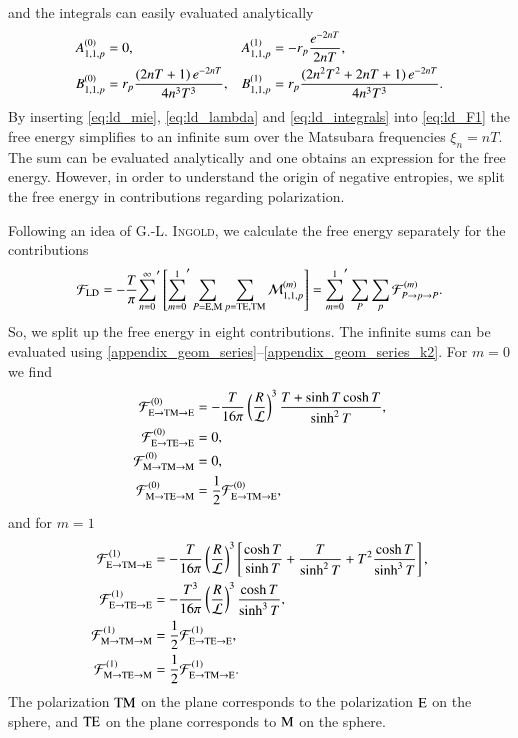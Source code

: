 and the integrals can easily evaluated analytically
\begin{align}
\nonumber
A_{1,1,p}^{(0)} &= 0, &
A_{1,1,p}^{(1)} &= -r_p \frac{e^{-2nT}}{2nT}, \\
\label{eq:ld_integrals}
B_{1,1,p}^{(0)} &= r_p \frac{(2nT+1) \, e^{-2nT}}{4n^3T^3}, &
B_{1,1,p}^{(1)} &= r_p \frac{(2n^2T^2+2nT+1) \, e^{-2nT}}{4n^3T^3}.
\end{align}
By inserting \eqref{eq:ld_mie}, \eqref{eq:ld_lambda} and
\eqref{eq:ld_integrals} into \eqref{eq:ld_F1} the free energy simplifies to an
infinite sum over the Matsubara frequencies $\xi_n=nT$. The sum can be
evaluated analytically and one obtains an expression for the free energy.
However, in order to understand the origin of negative entropies, we split the
free energy in contributions regarding polarization.

Following an idea of \textsc{G.-L. Ingold}, we calculate the free energy
separately for the contributions
\begin{equation}
\mathcal{F}_\text{LD} = -\frac{T}{\pi} {\sum_{n=0}^\infty}^\prime \left[ {\sum_{m=0}^1}^\prime \sum_{P=\text{E},\text{M}} \sum_{p=\mathrm{TE},\mathrm{TM}} \mathcal{M}^{(m)}_{1,1,p} \right]
= {\sum_{m=0}^1}^\prime \sum_P \sum_p \mathcal{F}^{(m)}_{P\to p \to P}.
\end{equation}
So, we split up the free energy in eight contributions. The infinite sums can be
evaluated using \eqref{appendix_geom_series}--\eqref{appendix_geom_series_k2}.
For $m=0$ we find
\begin{align}
\mathcal{F}^{(0)}_{\text{E}\to\mathrm{TM}\to\text{E}} &= - \frac{T}{16\pi} \left(\frac{R}{\mathcal{L}}\right)^3 \frac{T + \sinh T \cosh T}{\sinh^2 T}, \\
\mathcal{F}^{(0)}_{\text{E}\to\mathrm{TE}\to\text{E}} &= 0, \\
\mathcal{F}^{(0)}_{\text{M}\to\mathrm{TM}\to\text{M}} &= 0, \\
\mathcal{F}^{(0)}_{\text{M}\to\mathrm{TE}\to\text{M}} &= \frac{1}{2} \mathcal{F}^{(0)}_{\text{E}\to\mathrm{TM}\to\text{E}},
\end{align}
and for $m=1$
\begin{align}
\mathcal{F}^{(1)}_{\text{E}\to\mathrm{TM}\to\text{E}} &= -\frac{T}{16\pi} \left(\frac{R}{\mathcal{L}}\right)^3 \left[\frac{\cosh T}{\sinh T} + \frac{T}{\sinh^2 T} + T^2\frac{\cosh T}{\sinh^3 T}\right], \\
\mathcal{F}^{(1)}_{\text{E}\to\mathrm{TE}\to\text{E}} &= -\frac{T^3}{16\pi} \left(\frac{R}{\mathcal{L}}\right)^3 \frac{\cosh T}{\sinh^3 T}, \\
\mathcal{F}^{(1)}_{\text{M}\to\mathrm{TM}\to\text{M}} &= \frac{1}{2} \mathcal{F}^{(1)}_{\text{E}\to\mathrm{TE}\to\text{E}}, \\
\mathcal{F}^{(1)}_{\text{M}\to\mathrm{TE}\to\text{M}} &= \frac{1}{2} \mathcal{F}^{(1)}_{\text{E}\to\mathrm{TM}\to\text{E}}.
\end{align}
The polarization $\mathrm{TM}$ on the plane corresponds to the polarization $\text{E}$ on
the sphere, and $\mathrm{TE}$ on the plane corresponds to $\text{M}$ on the sphere.

